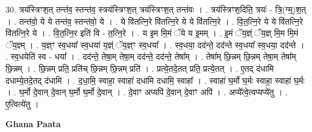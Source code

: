 \documentclass[17pt]{extarticle}
\begin{document}
30. त्रय॑स्त्रिꣳश॒त् तन्त॑व॒ स्तन्त॑व॒ स्त्रय॑स्त्रिꣳश॒त् त्रय॑स्त्रिꣳश॒त् तन्त॑वः । . त्रय॑स्त्रिꣳश॒दिति॒ त्रयः॑ - त्रि॒(ग्म्॒)श॒त् । . तन्त॑वो॒ ये ये तन्त॑व॒ स्तन्त॑वो॒ ये । . ये वि॑तत्नि॒रे वि॑तत्नि॒रे ये ये वि॑तत्नि॒रे । . वि॒त॒त्नि॒रे ये ये वि॑तत्नि॒रे वि॑तत्नि॒रे ये । . वि॒त॒त्नि॒र इति॑ वि - त॒त्नि॒रे । . य इ॒म मि॒मं ॅये य इ॒मम् । . इ॒मं ॅय॒ज्ञ्ं ॅय॒ज्ञ् मि॒म मि॒मं ॅय॒ज्ञ्म् । . य॒ज्ञ्ꣳ स्व॒धया᳚ स्व॒धया॑ य॒ज्ञ्ं ॅय॒ज्ञ्ꣳ स्व॒धया᳚ । . स्व॒धया॒ दद॑न्ते॒ दद॑न्ते स्व॒धया᳚ स्व॒धया॒ दद॑न्ते । . स्व॒धयेति॑ स्व - धया᳚ । . दद॑न्ते॒ तेषा॒म् तेषा॒म् दद॑न्ते॒ दद॑न्ते॒ तेषा᳚म् । . तेषा᳚म् छि॒न्नम् छि॒न्नम् तेषा॒म् तेषा᳚म् छि॒न्नम् । . छि॒न्नम् प्रति॒ प्रति॑च् छि॒न्नम् छि॒न्नम् प्रति॑ । . प्रत्ये॒तदे॒तत् प्रति॒ प्रत्ये॒तत् । . ए॒तद् द॑धामि दधाम्ये॒तदे॒तद् द॑धामि । . द॒धा॒मि॒ स्वाहा॒ स्वाहा॑ दधामि दधामि॒ स्वाहा᳚ । . स्वाहा॑ घ॒र्मो घ॒र्मः स्वाहा॒ स्वाहा॑ घ॒र्मः । . घ॒र्मो दे॒वान् दे॒वान् घ॒र्मो घ॒र्मो दे॒वान् । . दे॒वाꣳ अप्यपि॑ दे॒वान् दे॒वाꣳ अपि॑ । . अप्ये᳚त्वे॒त्वप्यप्ये॑तु । . ए॒त्वित्ये॑तु । \newline

\textbf{Ghana Paata } \newline
\end{document}
